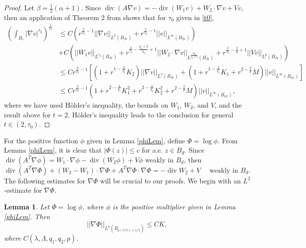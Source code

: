 \documentclass[12pt,reqno]{amsart}
\theoremstyle{plain}
\newtheorem{lem}{Lemma}
\theoremstyle{definition}
\DeclareMathOperator{\di}{div}
\newcommand{\al}{\alpha}
\newcommand{\be}{\beta}
\newcommand{\la}{\lambda}
\newcommand{\La}{\Lambda}
\newcommand{\iny}{\infty}
\newcommand{\gr}{\nabla}
\newcommand{\norm}[1]{\left\vert \left\vert #1\right\vert\right\vert}
\newcommand{\abs}[1]{\left\vert#1\right\vert}
\newcommand{\brac}[1]{\left[#1\right]}
\newcommand{\pr}[1]{\left( #1 \right) }
\begin{document}
\begin{proof}
Let $\be = \frac 1 2 \pr{\al + 1}$.
Since $\di \pr{A \gr v} = - \di\pr{W_1 v} + W_2 \cdot \gr v + V v$, then an application of Theorem 2 from \cite{Mey63} shows that for $\tau_0$ given in \eqref{t0},
\begin{align*}
\pr{\int_{B_{r}} \abs{\gr v}^{\tau_0}}^{\frac 1 {\tau_0}} 
&\le C\pr{r^{\frac 2 {\tau_0} -1} \norm{\gr v}_{L^2\pr{B_{\be r}}}
+ r^{\frac 2 {\tau_0}- 1} \norm{v}_{L^\iny\pr{B_{\be r}}}} \\
&+ C \pr{\norm{W_1 v}_{L^{\tau_0}\pr{B_{\be r}}}
+ r^{\frac 2 {\tau_0} - \frac {q_2+2}{q_2} + 1} \norm{W_2 \cdot \gr v}_{L^{\frac{2q_2}{q_2+2}}\pr{B_{\be r}}}
+r^{\frac 2 {\tau_0} - \frac 2 p + 1} \norm{V v}_{L^p\pr{B_{\be r}}}} \\
&\le C r^{\frac 2 {\tau_0} -1} \brac{ \pr{1 + r^{1 - \frac {2}{q_2} }K_2 } \norm{\gr v}_{L^{2}\pr{B_{\be r}}} 
+ \pr{1 + r^{1 - \frac 2 {q_1}} K_1 + r^{2 - \frac 2 p } M } \norm{v}_{L^\iny\pr{B_{\al r}}} } \\
&\le C r^{\frac 2 {\tau_0} -1}  \pr{1 + r^{2 - \frac {4}{q_1} }K_1^2 + r^{2 - \frac {4}{q_2} }K_2^2 + r^{2 - \frac 2 p } M  } \norm{v}_{L^\iny\pr{B_{\al r}}}, 
\end{align*}
where we have used H\"older's inequality, the bounds on $W_1$, $W_2$, and $V$, and the result above for $t = 2$.
H\"older's inequality leads to the conclusion for general $t \in (2, \tau_0)$.
\end{proof}

For the positive function $\phi$ given in Lemma \ref{phiLem}, define $\Phi = \log \phi$.
From Lemma \ref{phiLem}, it is clear that $\abs{\Phi\pr{z}} \le c$ for a.e. $z \in B_d$.
Since $\di \pr{A^T \gr \phi } = W_1 \cdot \gr \phi - \di \pr{W_2 \phi} + V \phi$ weakly in $B_d$, then
\begin{equation}
\di\pr{A^T \gr \Phi} + \pr{W_2 - W_1} \cdot \gr \Phi + A^T \gr \Phi \cdot \gr \Phi  = - \di W_2 + V  \quad \text{ weakly in } B_d.
\label{phiPDE}
\end{equation}
The following estimates for $\gr \Phi$ will be crucial to our proofs.
We begin with an $L^2$-estimate for $\gr \Phi$.

\begin{lem}
Let $\Phi = \log \phi$, where $\phi$ is the positive multiplier given in Lemma \ref{phiLem}.
Then $$\norm{\gr \Phi}_{L^2\pr{B_{\rho\pr{7/5}+1/5}}} \le C K,$$ where $C\pr{\la, \La, q_1, q_2, p}$.
\label{grPhiL2}
\end{lem}
\end{document}
